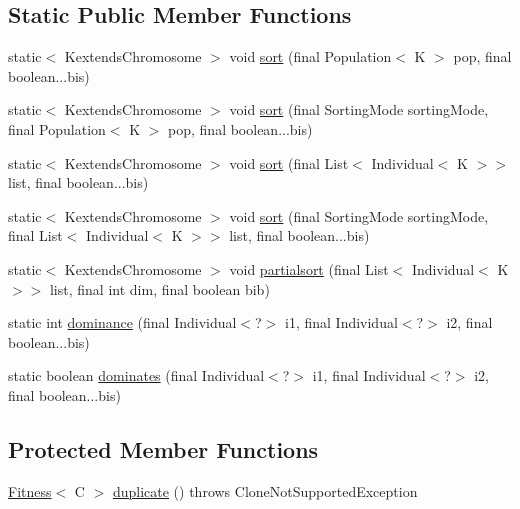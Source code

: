 \subsection*{Static Public Member Functions}
\begin{DoxyCompactItemize}
\item 
static$<$ Kextends\-Chromosome $>$ void \hyperlink{classjenes_1_1population_1_1_fitness_3_01_c_01extends_01_chromosome_01_4_a2601adaae23ba51f4f078b2e47bac2bf}{sort} (final Population$<$ K $>$ pop, final boolean...\-bis)
\item 
static$<$ Kextends\-Chromosome $>$ void \hyperlink{classjenes_1_1population_1_1_fitness_3_01_c_01extends_01_chromosome_01_4_a814eb910523f378522273a3fdd0cf1a6}{sort} (final Sorting\-Mode sorting\-Mode, final Population$<$ K $>$ pop, final boolean...\-bis)
\item 
static$<$ Kextends\-Chromosome $>$ void \hyperlink{classjenes_1_1population_1_1_fitness_3_01_c_01extends_01_chromosome_01_4_a160b6471e47adc4386c1dd4122a50e25}{sort} (final List$<$ Individual$<$ K $>$$>$ list, final boolean...\-bis)
\item 
static$<$ Kextends\-Chromosome $>$ void \hyperlink{classjenes_1_1population_1_1_fitness_3_01_c_01extends_01_chromosome_01_4_a351dc03eea62cdfb46b5dfe8e75b34cd}{sort} (final Sorting\-Mode sorting\-Mode, final List$<$ Individual$<$ K $>$$>$ list, final boolean...\-bis)
\item 
static$<$ Kextends\-Chromosome $>$ void \hyperlink{classjenes_1_1population_1_1_fitness_3_01_c_01extends_01_chromosome_01_4_abb440f362a2cd5578c25d2d8dd09a33f}{partialsort} (final List$<$ Individual$<$ K $>$$>$ list, final int dim, final boolean bib)
\item 
static int \hyperlink{classjenes_1_1population_1_1_fitness_3_01_c_01extends_01_chromosome_01_4_a40ee2060c7904075c6606c73f169e7b8}{dominance} (final Individual$<$?$>$ i1, final Individual$<$?$>$ i2, final boolean...\-bis)
\item 
static boolean \hyperlink{classjenes_1_1population_1_1_fitness_3_01_c_01extends_01_chromosome_01_4_a86b15569d72a9b78c7324ee344ef3dcd}{dominates} (final Individual$<$?$>$ i1, final Individual$<$?$>$ i2, final boolean...\-bis)
\end{DoxyCompactItemize}
\subsection*{Protected Member Functions}
\begin{DoxyCompactItemize}
\item 
\hyperlink{classjenes_1_1population_1_1_fitness_3_01_c_01extends_01_chromosome_01_4_aba60bd43d62c74ca35946ce9c75bff8f}{Fitness}$<$ C $>$ \hyperlink{classjenes_1_1population_1_1_fitness_3_01_c_01extends_01_chromosome_01_4_acea9db9e50fbde7132dc1de0c3baa641}{duplicate} ()  throws Clone\-Not\-Supported\-Exception 
\end{DoxyCompactItemize}

